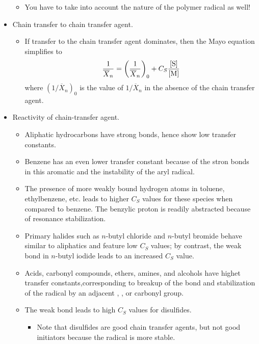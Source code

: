 \documentclass[../notes.tex]{subfiles}
\begin{document}
\begin{itemize}
\begin{itemize}
\begin{equation*}
        \end{equation*}
        \item You have to take into account the nature of the polymer radical as well!
    \end{itemize}
    \item Chain transfer to chain transfer agent.
    \begin{itemize}
        \item If transfer to the chain transfer agent dominates, then the Mayo equation simplifies to
        \begin{equation*}
            \frac{1}{\overline{X}_n} = \left( \frac{1}{\overline{X}_n} \right)_0+C_S\frac{[\ce{S}]}{[\ce{M}]}
        \end{equation*}
        where $(1/\overline{X}_n)_0$ is the value of $1/\overline{X}_n$ in the absence of the chain transfer agent.
    \end{itemize}
    \item Reactivity of chain-transfer agent.
    \begin{itemize}
        \item Aliphatic hydrocarbons have strong  bonds, hence show low transfer constants.
        \item Benzene has an even lower transfer constant because of the stron  bonds in this aromatic and the instability of the aryl radical.
        \item The presence of more weakly bound hydrogen atoms in toluene, ethylbenzene, etc. leads to higher $C_S$ values for these species when compared to benzene. The benzylic proton is readily abstracted because of resonance stabilization.
        \item Primary halides such as $n$-butyl chloride and $n$-butyl bromide behave similar to aliphatics and feature low $C_S$ values; by contrast, the weak  bond in $n$-butyl iodide leads to an increased $C_S$ value.
        \item Acids, carbonyl compounds, ethers, amines, and alcohols have highet transfer constants,corresponding to breakup of the  bond and stabilization of the radical by an adjacent , , or carbonyl group.
        \item The weak  bond leads to high $C_S$ values for disulfides.
        \begin{itemize}
            \item Note that disulfides are good chain transfer agents, but not good initiators because the radical is more stable.

\end{itemize}
\end{itemize}
\end{itemize}
\end{document}
